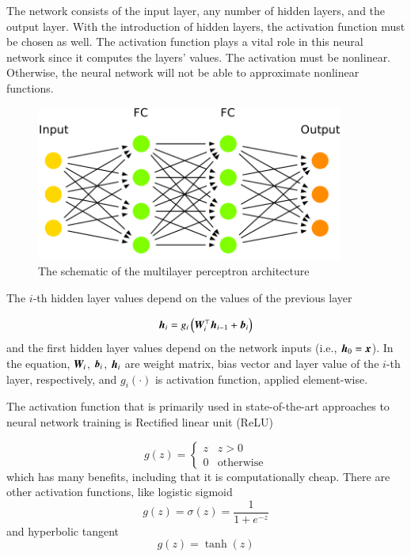The network consists of the input layer, any number of hidden layers, and the output layer. With the introduction of hidden layers, the activation function must be chosen as well. The activation function plays a vital role in this neural network since it computes the layers' values. The activation must be nonlinear. Otherwise, the neural network will not be able to approximate nonlinear functions.

\begin{figure}
    \centering
    \includegraphics[width=0.9\textwidth]{slike/arch_mlp.pdf}
    \caption{The schematic of the multilayer perceptron architecture}
    \label{fig:MLPArch}
\end{figure}

The $i$-th hidden layer values depend on the values of the previous layer

\begin{equation}
    {\bm{h}}_i = g_i\left({\bm{W}}_i^{\top}{\bm{h}}_{i-1}+{\bm{b}}_i \right)
\end{equation}
and the first hidden layer values depend on the network inputs (i.e., ${\bm{h}}_0={\bm{x}}$). In the equation, ${\bm{W}}_i$, ${\bm{b}}_i$, ${\bm{h}}_i$ are weight matrix, bias vector and layer value of the $i$-th layer, respectively, and $g_i(\cdot)$ is activation function, applied element-wise.

The activation function that is primarily used in state-of-the-art approaches to neural network training is Rectified linear unit (ReLU)

\[
    g(z)=\begin{cases}
    z & z>0\\
    0 & \textrm{otherwise}
    \end{cases}
\]
which has many benefits, including that it is computationally cheap. There are other activation functions, like logistic sigmoid
\[
    g(z)=\sigma(z)=\frac{1}{1+e^{-z}}
\]
and hyperbolic tangent
\[
    g(z)=\tanh(z)
\]

